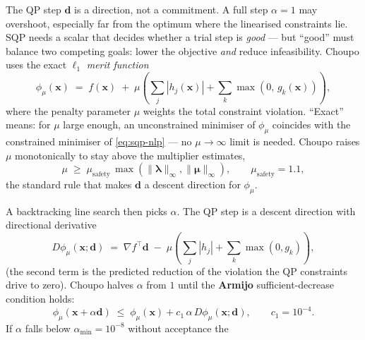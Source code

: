\documentclass[11pt,a4paper]{article}
\newcommand{\xv}{\mathbf{x}}
\newcommand{\dv}{\mathbf{d}}                          %
\begin{document}
The QP step $\dv$ is a direction, not a commitment. A full step
$\alpha = 1$ may overshoot, especially far from the optimum where the
linearised constraints lie. SQP needs a scalar that decides whether a
trial step is \emph{good} --- but ``good'' must balance two competing
goals: lower the objective \emph{and} reduce infeasibility. Choupo uses
the exact $\ell_1$ \emph{merit function} \cite{NocedalWright}
\begin{equation}
   \phi_\mu(\xv) \;=\; f(\xv)
     \;+\; \mu \!\left(
       \sum_j |h_j(\xv)| + \sum_k \max(0,\, g_k(\xv))
     \right),
   \label{eq:l1-merit}
\end{equation}
where the penalty parameter $\mu$ weights the total constraint
violation. ``Exact'' means: for $\mu$ large enough, an unconstrained
minimiser of $\phi_\mu$ coincides with the constrained minimiser of
\eqref{eq:sqp-nlp} --- no $\mu \to \infty$ limit is needed. Choupo
raises $\mu$ monotonically to stay above the multiplier estimates,
\begin{equation}
   \mu \;\ge\; \mu_{\mathrm{safety}}\,
     \max\!\left(\|\boldsymbol\lambda\|_\infty,
                 \|\boldsymbol\mu\|_\infty\right),
   \qquad \mu_{\mathrm{safety}} = 1.1,
   \label{eq:mu-rule}
\end{equation}
the standard rule that makes $\dv$ a descent direction for $\phi_\mu$.

A backtracking line search then picks $\alpha$. The QP step is a descent
direction with directional derivative
\begin{equation}
   D\phi_\mu(\xv; \dv)
     \;=\; \nabla f^{\!\top}\dv
       \;-\; \mu\!\left(
         \sum_j |h_j| + \sum_k \max(0, g_k)
       \right),
   \label{eq:merit-deriv}
\end{equation}
(the second term is the predicted reduction of the violation the QP
constraints drive to zero). Choupo halves $\alpha$ from $1$ until the
\textbf{Armijo} sufficient-decrease condition holds:
\begin{equation}
   \phi_\mu(\xv + \alpha\dv)
     \;\le\; \phi_\mu(\xv) + c_1\, \alpha\, D\phi_\mu(\xv; \dv),
   \qquad c_1 = 10^{-4}.
   \label{eq:armijo}
\end{equation}
If $\alpha$ falls below $\alpha_{\min} = 10^{-8}$ without acceptance the
\end{document}
